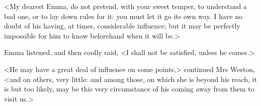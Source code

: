 <My dearest Emma, do not pretend, with your sweet temper, to understand a bad one, or to lay down rules for it: you must let it go its own way. I have no doubt of his having, at times, considerable influence; but it may be perfectly impossible for him to know beforehand when it will be.>

Emma listened, and then coolly said, <I shall not be satisfied, unless he comes.>

<He may have a great deal of influence on some points,> continued Mrs Weston, <and on others, very little: and among those, on which she is beyond his reach, it is but too likely, may be this very circumstance of his coming away from them to visit us.>